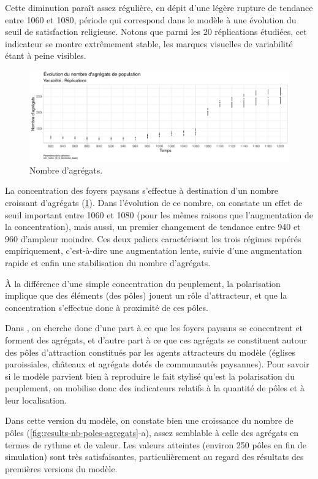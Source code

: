Cette diminution paraît assez régulière, en dépit d'une légère rupture de tendance entre 1060 et 1080, période qui correspond dans le modèle à une évolution du seuil de satisfaction religieuse.
Notons que parmi les 20 réplications étudiées, cet indicateur se montre extrêmement stable, les marques visuelles de variabilité étant à peine visibles.

\begin{figure}[H]
	\centering
	\includegraphics[width=\linewidth]{img/results_6_6/Agregats_Nb_Haut.pdf}
	\caption{Nombre d'agrégats.}
	\label{fig:results-nb-agregrats}
\end{figure}

La concentration des foyers paysans s'effectue à destination d'un nombre croissant d'agrégats (\cref{fig:results-nb-agregrats}).
Dans l'évolution de ce nombre, on constate un effet de seuil important entre 1060 et 1080 (pour les mêmes raisons que l'augmentation de la concentration), mais aussi, un premier changement de tendance entre 940 et 960 d'ampleur moindre.
Ces deux paliers caractérisent les trois régimes repérés empiriquement, c'est-à-dire une augmentation lente, suivie d'une augmentation rapide et enfin une stabilisation du nombre d'agrégats.

À la différence d'une simple concentration du peuplement, la polarisation implique que des éléments (des pôles) jouent un rôle d'attracteur, et que la concentration s'effectue donc à proximité de ces pôles.

Dans \simfeodal{}, on cherche donc d'une part à ce que les foyers paysans se concentrent et forment des agrégats, et d'autre part à ce que ces agrégats se constituent autour des pôles d'attraction constitués par les agents attracteurs du modèle (églises paroissiales, châteaux et agrégats dotés de communautés paysannes).
Pour savoir si le modèle parvient bien à reproduire le fait stylisé qu'est la polarisation du peuplement, on mobilise donc des indicateurs relatifs à la quantité de pôles et à leur localisation.

Dans cette version du modèle, on constate bien une croissance du nombre de pôles (\cref{fig:results-nb-poles-agregats}-a), assez semblable à celle des agrégats en termes de rythme et de valeur.
Les valeurs atteintes (environ 250 pôles en fin de simulation) sont très satisfaisantes, particulièrement au regard des résultats des premières versions du modèle.


